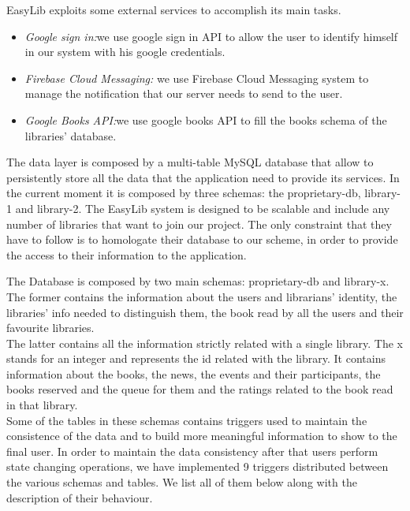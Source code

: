 EasyLib exploits some external services to accomplish its main tasks.

\begin{itemize}
\item \emph{Google sign in:}we use google sign in API to allow the user to identify himself in our system with his google credentials.
\item \emph{Firebase Cloud Messaging: } we use Firebase Cloud Messaging system to manage the notification that our server needs to send to the user.
\item \emph{Google Books API:}we use google books API to fill the books schema of the libraries’ database.
\end{itemize}

The data layer is composed by a multi-table MySQL database that allow to persistently store all the data that the application need to provide its services. In the current moment it is composed by three schemas: the proprietary-db, library-1 and library-2. The EasyLib system is designed to be scalable and include any number of libraries that want to join our project. The only constraint that they have to follow is to homologate their database to our scheme, in order to provide the access to their information to the application. 

The Database is composed by two main schemas: proprietary-db and library-x. The former contains the information about the users and librarians’ identity, the libraries’ info needed to distinguish them, the book read by all the users and their favourite libraries.\\
The latter contains all the information strictly related with a single library. The x stands for an integer and represents the id related with the library. It contains information about the books, the news, the events and their participants, the books reserved and the queue for them and the ratings related to the book read in that library.\\
Some of the tables in these schemas contains triggers used to maintain the consistence of the data and to build more meaningful information to show to the final user. 
In order to maintain the data consistency after that users perform state changing operations, we have implemented 9 triggers distributed between the various schemas and tables. We list all of them below along with the description of their behaviour.

